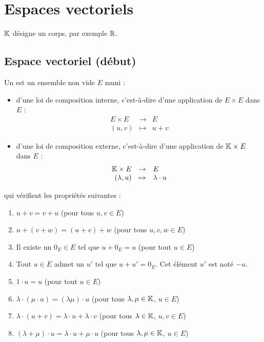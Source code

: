 \documentclass[10pt,class=article,crop=false]{standalone}
\begin{document}
	
\section{Espaces vectoriels}

\begin{multicols}{2}
	
$\mathbb{K}$ désigne un corps, par exemple $\mathbb{R}$.

\subsection{Espace vectoriel (début)}


\begin{definition}
	Un  est un ensemble non vide $E$ muni :
	\begin{itemize}
		\item d'une loi de composition interne, c'est-à-dire
		d'une application de $E \times E$ dans $E$ :
		$$\begin{array}{rcl}
			E \times E & \to & E\\
			(u, v) & \mapsto & u+v
		\end{array}$$
		
		\item d'une loi de composition externe,
		c'est-à-dire d'une application de $\mathbb{K} \times E$ dans $E$ :
		$$\begin{array}{rcl}
			\mathbb{K} \times E & \to & E\\
			(\lambda, u ) & \mapsto & \lambda \cdot u
		\end{array}$$
	\end{itemize}
	
	qui vérifient les propriétés suivantes :
	\begin{enumerate}
		\item $u + v = v + u$ \quad (pour tous $u,v \in E$)
		\item $u + (v+w) = (u+v) +w$ \quad (pour tous $u,v,w \in E$)
		\item Il existe un  $0_E \in E$ tel que $u + 0_E = u$ \quad (pour tout $u \in E$)
		\item Tout $u \in E$ admet un  $u'$ tel que $u + u' = 0_E$.
		Cet élément $u'$ est noté $-u$.
		\item $1 \cdot u = u$ \quad (pour tout $u \in E$)
		\item $\lambda \cdot (\mu \cdot u) = (\lambda\mu )\cdot u$ \quad (pour tous $\lambda, \mu \in \mathbb{K}$, $u \in E$)
		\item $\lambda \cdot (u+v) = \lambda \cdot u + \lambda \cdot v$ \quad (pour tous $\lambda \in \mathbb{K}$, $u,v \in E$)
		\item $(\lambda + \mu ) \cdot u = \lambda \cdot u + \mu \cdot u$ \quad (pour tous $\lambda,\mu \in \mathbb{K}$, $u \in E$)
	\end{enumerate}
\end{definition}



\end{multicols}
\end{document}
